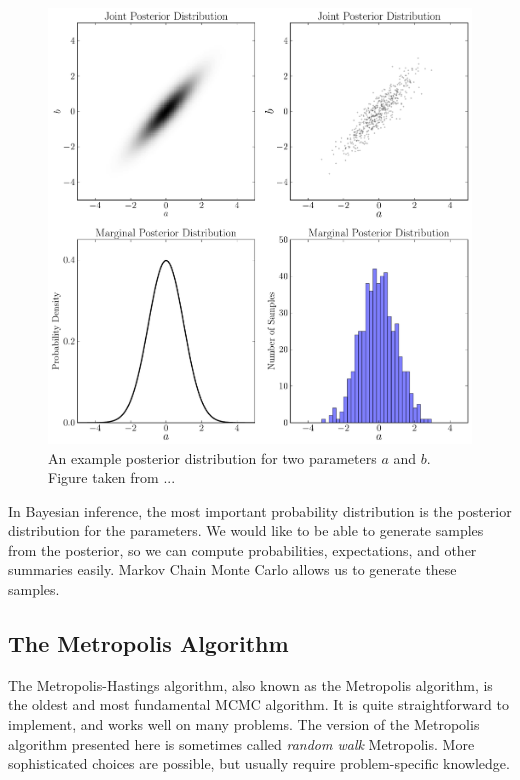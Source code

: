 \begin{figure}
\begin{center}
\includegraphics[scale=0.5]{../marginalisation.pdf}
\caption{An example posterior distribution for two parameters $a$ and $b$.
Figure taken from ...
\label{fig:marginalisation}}
\end{center}
\end{figure}

In Bayesian inference, the most important probability distribution is the
posterior distribution for the parameters. We would like to be able to
generate samples from the posterior, so we can compute probabilities,
expectations, and other summaries easily. Markov Chain Monte Carlo allows us
to generate these samples.

\subsection{The Metropolis Algorithm}
The Metropolis-Hastings algorithm, also known as the Metropolis algorithm, is
the oldest and most fundamental MCMC algorithm.
It is quite straightforward to implement, and works well on many problems.
The version of the Metropolis algorithm presented here is sometimes called
{\it random walk} Metropolis. More sophisticated choices are possible,
but usually require problem-specific knowledge.

